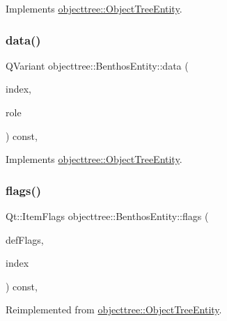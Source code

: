 Implements \mbox{\hyperlink{classobjecttree_1_1_object_tree_entity_a70fd25eccf88b305e9db15fbe3daeae8}{objecttree\+::\+Object\+Tree\+Entity}}.

\mbox{\label{classobjecttree_1_1_benthos_entity_a4dde2d711ad2c07d6971f3a222e07ff3}} 
\subsubsection{\texorpdfstring{data()}{data()}}
{\footnotesize\ttfamily Q\+Variant objecttree\+::\+Benthos\+Entity\+::data (\begin{DoxyParamCaption}\item[{const Q\+Model\+Index \&}]{index,  }\item[{int}]{role }\end{DoxyParamCaption}) const\hspace{0.3cm}{\ttfamily [override]}, {\ttfamily [virtual]}}



Implements \mbox{\hyperlink{classobjecttree_1_1_object_tree_entity_a2413c6573de18b451d97eb3800f10f35}{objecttree\+::\+Object\+Tree\+Entity}}.

\mbox{\label{classobjecttree_1_1_benthos_entity_a57ec678c2e68372b9d678e6f6b5546eb}} 
\subsubsection{\texorpdfstring{flags()}{flags()}}
{\footnotesize\ttfamily Qt\+::\+Item\+Flags objecttree\+::\+Benthos\+Entity\+::flags (\begin{DoxyParamCaption}\item[{Qt\+::\+Item\+Flags}]{def\+Flags,  }\item[{const Q\+Model\+Index \&}]{index }\end{DoxyParamCaption}) const\hspace{0.3cm}{\ttfamily [override]}, {\ttfamily [virtual]}}



Reimplemented from \mbox{\hyperlink{classobjecttree_1_1_object_tree_entity_a71042bfb5a8328bcbde9d283c0b1b28c}{objecttree\+::\+Object\+Tree\+Entity}}.

